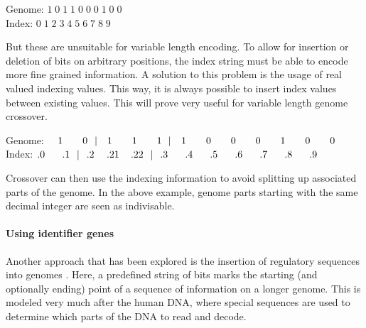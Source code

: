 \documentclass[11pt,a4paper,twoside,openright]{scrbook}
\begin{document}
\begin{tabbing}
\hspace{5.14cm}Genome:  \= \(1\;0\;1\;1\;0\;0\;0\;1\;0\;0\) \\
\hspace{5.14cm}Index:   \> \(0\;1\;2\;3\;4\;5\;6\;7\;8\;9\) \\
\end{tabbing}

But these are unsuitable for variable length encoding. To allow for insertion or deletion of bits on arbitrary positions, the index string must be able to encode more fine grained information. A solution to this problem is the usage of real valued indexing values. This way, it is always possible to insert index values between existing values. This will prove very useful for variable length genome crossover.

\smallbreak
\begin{tabbing}
  \hspace{1.2cm}Genome: \(\quad1\qquad0\hspace{0.71em}|\hspace{1em}1\qquad1\qquad1\hspace{0.65em}|\hspace{1.04em}1\qquad0\qquad0\qquad0\qquad1\qquad0\qquad0\) \\
  \hspace{1.2cm}Index: \hspace{0.54cm} \(.0\hspace{1.745em}.1\hspace{0.69em}|\hspace{0.71em}.2\hspace{1,25em}.21\hspace{1,15em}.22\hspace{0.71em}|\hspace{0.71em}.3\hspace{1.732em}.4\hspace{1.732em}.5\hspace{1.732em}.6\hspace{1.732em}.7\hspace{1.732em}.8\hspace{1.732em}.9\)
\end{tabbing}

Crossover can then use the indexing information to avoid splitting up associated parts of the genome. In the above example, genome parts starting with the same decimal integer are seen as indivisable.

\paragraph{Using identifier genes}
Another approach that has been explored is the insertion of regulatory sequences into genomes \cite{Mattiussi07}.
Here, a predefined string of bits marks the starting (and optionally ending) point of a sequence of information on a longer genome. This is modeled very much after the human DNA, where special sequences are used to determine which parts of the DNA to read and decode.
\end{document}
